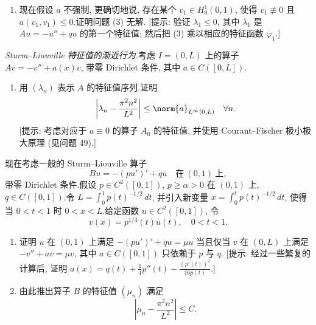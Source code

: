 \begin{exercise}
\begin{enumerate}[label=\arabic*., leftmargin=2.2em, itemsep=0.3em]
\begin{equation}
\begin{cases}
	      u>0 & \text{在}\ (0,1)\ \text{上},\\
	      u(0)=u(1)=0
	      \end{cases}
	      \tag{3}
	      \end{equation}
	      存在解 $u\in C^2([0,1])$.
	      [提示: 取 $u=ku_0$, 其中 $k>0$ 为某个适当的常数.]
	\item 现在假设 $a$ 不强制, 更确切地说, 存在某个
	      $v_1\in H_0^1(0,1)$, 使得 $v_1\not\equiv0$ 且
	      $a(v_1,v_1)\le0$.证明问题 (3) 无解.
	      [提示: 验证 $\lambda_1\le0$, 其中 $\lambda_1$ 是
	      $Au=-u''+qu$ 的第一个特征值; 然后把 (3) 乘以相应的特征函数
	      $\varphi_1$.]
\end{enumerate}
\end{exercise}

\begin{exercise}
\label{exer:8.42}
\emph{Sturm--Liouville 特征值的渐近行为.}考虑 $I=(0,L)$ 上的算子
$Av=-v''+a(x)v$, 带零 Dirichlet 条件, 其中 $a\in C([0,L])$.
\begin{enumerate}[label=\arabic*., leftmargin=2.2em, itemsep=0.3em]
	\item 用 $(\lambda_n)$ 表示 $A$ 的特征值序列.证明
	      \begin{equation*}
	      \left|\lambda_n-\frac{\pi^2n^2}{L^2}\right|
	      \le\norm{a}_{L^\infty(0,L)}\quad\forall n.
	      \end{equation*}
	      [提示: 考虑对应于 $a\equiv0$ 的算子 $A_0$ 的特征值, 并使用
	      Courant--Fischer 极小极大原理 (见问题 49).]
\end{enumerate}
现在考虑一般的 Sturm--Liouville 算子
\begin{equation*}
Bu=-(pu')'+qu\quad\text{在}\ (0,1)\ \text{上},
\end{equation*}
带零 Dirichlet 条件.假设 $p\in C^2([0,1])$, $p\ge\alpha>0$ 在 $(0,1)$ 上,
$q\in C([0,1])$.令 $L=\int_0^1p(t)^{-1/2}\,dt$, 并引入新变量
$x=\int_0^tp(t)^{-1/2}\,dt$, 使得当 $0<t<1$ 时 $0<x<L$.给定函数
$u\in C^2([0,1])$, 令
\begin{equation*}
v(x)=p^{1/4}(t)u(t),\quad 0<t<1.
\end{equation*}
\begin{enumerate}[label=\arabic*., leftmargin=2.2em, itemsep=0.3em, start=2]
	\item 证明 $u$ 在 $(0,1)$ 上满足 $-(pu')'+qu=\mu u$ 当且仅当 $v$ 在
	      $(0,L)$ 上满足 $-v''+av=\mu v$, 其中 $a\in C([0,1])$ 只依赖于
	      $p$ 与 $q$.
	      [提示: 经过一些繁复的计算后, 证明
	      $a(x)=q(t)+\frac14p''(t)-\frac{(p'(t))^2}{16p(t)}$.]
	\item 由此推出算子 $B$ 的特征值 $(\mu_n)$ 满足
	      \begin{equation*}
	      \left|\mu_n-\frac{\pi^2n^2}{L^2}\right|\le C.
	      \end{equation*}
\end{enumerate}
\end{exercise}
